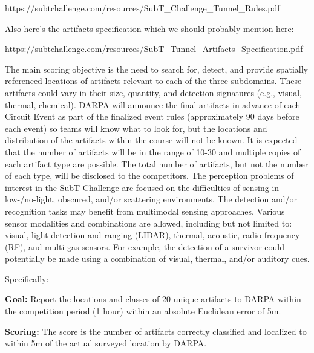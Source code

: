 https://subtchallenge.com/resources/SubT\_Challenge\_Tunnel\_Rules.pdf

Also here's the artifacts specification which we should probably mention here:

https://subtchallenge.com/resources/SubT\_Tunnel\_Artifacts\_Specification.pdf

The main scoring objective is the need to search for, detect, and provide spatially referenced
locations of artifacts relevant to each of the three subdomains. These artifacts could vary in their
size, quantity, and detection signatures (e.g., visual, thermal, chemical). DARPA will announce
the final artifacts in advance of each Circuit Event as part of the finalized event rules
(approximately 90 days before each event) so teams will know what to look for, but the locations
and distribution of the artifacts within the course will not be known. It is expected that the number
of artifacts will be in the range of 10-30 and multiple copies of each artifact type are possible. The
total number of artifacts, but not the number of each type, will be disclosed to the competitors.
The perception problems of interest in the SubT Challenge are focused on the difficulties of
sensing in low-/no-light, obscured, and/or scattering environments. The detection and/or
recognition tasks may benefit from multimodal sensing approaches. Various sensor modalities
and combinations are allowed, including but not limited to: visual, light detection and ranging
(LIDAR), thermal, acoustic, radio frequency (RF), and multi-gas sensors. For example, the
detection of a survivor could potentially be made using a combination of visual, thermal, and/or
auditory cues.

Specifically:

\textbf{Goal:} Report the locations and classes of 20 unique artifacts to DARPA within the competition period (1 hour) within an absolute Euclidean error of 5m.

\textbf{Scoring:} The score is the number of artifacts correctly classified and localized to within 5m of the actual surveyed location by DARPA.

